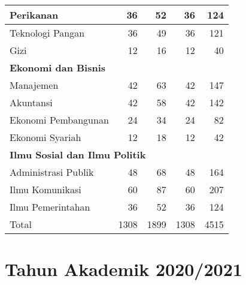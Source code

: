 \documentclass[
]{book}
\begin{document}
\begin{table}[H]
{\begin{tabular}{l|r|r|r|r}
\hline
\hspace{1em}Perikanan & 36 & 52 & 36 & 124\\
\hline
\hspace{1em}Teknologi Pangan & 36 & 49 & 36 & 121\\
\hline
\hspace{1em}Gizi & 12 & 16 & 12 & 40\\
\hline
\multicolumn{5}{l}{\textbf{Ekonomi dan Bisnis}}\\
\hline
\hspace{1em}Manajemen & 42 & 63 & 42 & 147\\
\hline
\hspace{1em}Akuntansi & 42 & 58 & 42 & 142\\
\hline
\hspace{1em}Ekonomi Pembangunan & 24 & 34 & 24 & 82\\
\hline
\hspace{1em}Ekonomi Syariah & 12 & 18 & 12 & 42\\
\hline
\multicolumn{5}{l}{\textbf{Ilmu Sosial dan Ilmu Politik}}\\
\hline
\hspace{1em}Administrasi Publik & 48 & 68 & 48 & 164\\
\hline
\hspace{1em}Ilmu Komunikasi & 60 & 87 & 60 & 207\\
\hline
\hspace{1em}Ilmu Pemerintahan & 36 & 52 & 36 & 124\\
\hline
Total & 1308 & 1899 & 1308 & 4515\\
\hline
\end{tabular}}
\end{table}

\hypertarget{tahun-akademik-20202021}{%
\section{Tahun Akademik 2020/2021}\label{tahun-akademik-20202021}}
\end{document}
